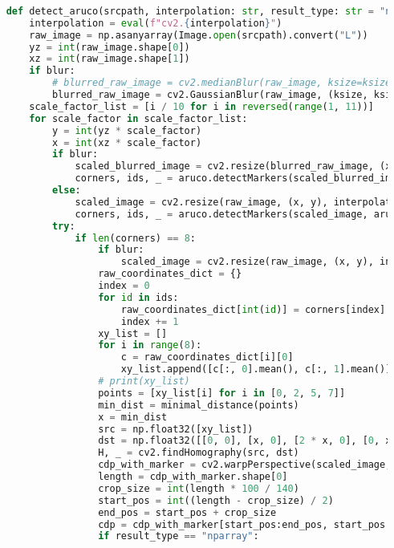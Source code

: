 \begin{lstlisting}[language=Python]
    
    def detect_aruco(srcpath, interpolation: str, result_type: str = "nparray", blur: bool = True, ksize: int = 5):
        interpolation = eval(f"cv2.{interpolation}")
        raw_image = np.asanyarray(Image.open(srcpath).convert("L"))
        yz = int(raw_image.shape[0])
        xz = int(raw_image.shape[1])
        if blur:
            # blurred_raw_image = cv2.medianBlur(raw_image, ksize=ksize)
            blurred_raw_image = cv2.GaussianBlur(raw_image, (ksize, ksize), 0)
        scale_factor_list = [i / 10 for i in reversed(range(1, 11))]
        for scale_factor in scale_factor_list:
            y = int(yz * scale_factor)
            x = int(xz * scale_factor)
            if blur:
                scaled_blurred_image = cv2.resize(blurred_raw_image, (x, y), interpolation=interpolation)
                corners, ids, _ = aruco.detectMarkers(scaled_blurred_image, aruco_dict, parameters=parameters)
            else:
                scaled_image = cv2.resize(raw_image, (x, y), interpolation=interpolation)
                corners, ids, _ = aruco.detectMarkers(scaled_image, aruco_dict, parameters=parameters)
            try:
                if len(corners) == 8:
                    if blur:
                        scaled_image = cv2.resize(raw_image, (x, y), interpolation=interpolation)
                    raw_coordinates_dict = {}
                    index = 0
                    for id in ids:
                        raw_coordinates_dict[int(id)] = corners[index]
                        index += 1
                    xy_list = []
                    for i in range(8):
                        c = raw_coordinates_dict[i][0]
                        xy_list.append([c[:, 0].mean(), c[:, 1].mean()])
                    # print(xy_list)
                    points = [xy_list[i] for i in [0, 2, 5, 7]]
                    min_dist = minimal_distance(points)
                    x = min_dist
                    src = np.float32([xy_list])
                    dst = np.float32([[0, 0], [x, 0], [2 * x, 0], [0, x], [2 * x, x], [0, 2 * x], [x, 2 * x], [2 * x, 2 * x]])
                    H, _ = cv2.findHomography(src, dst)
                    cdp_with_marker = cv2.warpPerspective(scaled_image, H, (min_dist * 2, min_dist * 2))
                    length = cdp_with_marker.shape[0]
                    crop_size = int(length * 100 / 140)
                    start_pos = int((length - crop_size) / 2)
                    end_pos = start_pos + crop_size
                    cdp = cdp_with_marker[start_pos:end_pos, start_pos:end_pos]
                    if result_type == "nparray":

\end{lstlisting}
